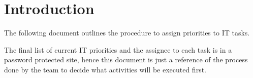 \section{Introduction}

The following document outlines the procedure to assign priorities to IT tasks.

The final list of current IT priorities and the assignee to each task is in a password protected site, hence this document is just a reference of the process done by the team to decide what activities will be executed first. 
